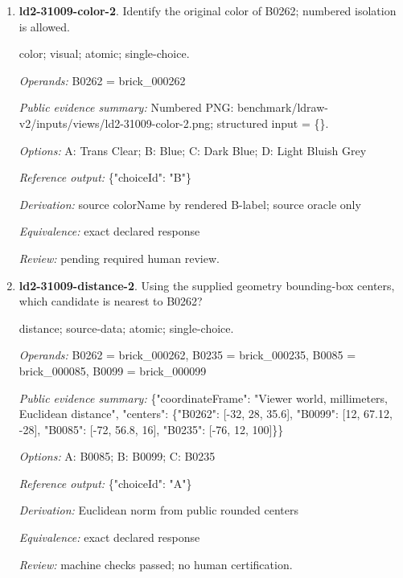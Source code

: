 \begin{enumerate}
\par{\small distance; source-data; atomic; single-choice.\par\textit{Operands:} B0163 = brick\_000163, B0145 = brick\_000145, B0063 = brick\_000063, B0200 = brick\_000200\par\textit{Public evidence summary:} \{"coordinateFrame": "Viewer world, millimeters, Euclidean distance", "centers": \{"B0163": [4, 79.2, -16], "B0200": [-32, 96.8, 12], "B0063": [-68, 40.8, 0], "B0145": [12, 15.2, -52]\}\}\par\textit{Options:} A: B0063; B: B0200; C: B0145\par\textit{Reference output:} \{"choiceId": "B"\}\par\textit{Derivation:} Euclidean norm from public rounded centers\par\textit{Equivalence:} exact declared response\par\textit{Review:} machine checks passed; no human certification.}
\item \textbf{ld2-31009-color-2}. Identify the original color of B0262; numbered isolation is allowed.
\par{\small color; visual; atomic; single-choice.\par\textit{Operands:} B0262 = brick\_000262\par\textit{Public evidence summary:} Numbered PNG: benchmark/ldraw-v2/inputs/views/ld2-31009-color-2.png; structured input = \{\}.\par\textit{Options:} A: Trans Clear; B: Blue; C: Dark Blue; D: Light Bluish Grey\par\textit{Reference output:} \{"choiceId": "B"\}\par\textit{Derivation:} source colorName by rendered B-label; source oracle only\par\textit{Equivalence:} exact declared response\par\textit{Review:} pending required human review.}
\item \textbf{ld2-31009-distance-2}. Using the supplied geometry bounding-box centers, which candidate is nearest to B0262?
\par{\small distance; source-data; atomic; single-choice.\par\textit{Operands:} B0262 = brick\_000262, B0235 = brick\_000235, B0085 = brick\_000085, B0099 = brick\_000099\par\textit{Public evidence summary:} \{"coordinateFrame": "Viewer world, millimeters, Euclidean distance", "centers": \{"B0262": [-32, 28, 35.6], "B0099": [12, 67.12, -28], "B0085": [-72, 56.8, 16], "B0235": [-76, 12, 100]\}\}\par\textit{Options:} A: B0085; B: B0099; C: B0235\par\textit{Reference output:} \{"choiceId": "A"\}\par\textit{Derivation:} Euclidean norm from public rounded centers\par\textit{Equivalence:} exact declared response\par\textit{Review:} machine checks passed; no human certification.}

\end{enumerate}
